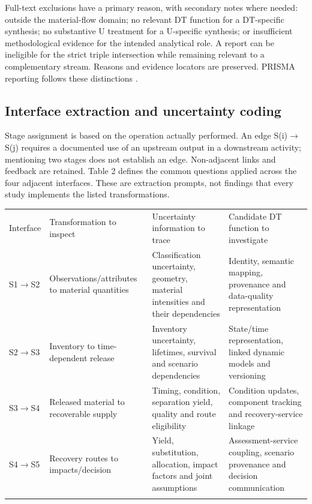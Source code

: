 Full-text exclusions have a primary reason, with secondary notes where needed: outside the material-flow domain; no relevant DT function for a DT-specific synthesis; no substantive U treatment for a U-specific synthesis; or insufficient methodological evidence for the intended analytical role. A report can be ineligible for the strict triple intersection while remaining relevant to a complementary stream. Reasons and evidence locators are preserved. PRISMA reporting follows these distinctions \citep{M01}.

\subsection{Interface extraction and uncertainty coding}

Stage assignment is based on the operation actually performed. An edge S(i)$\rightarrow$S(j) requires a documented use of an upstream output in a downstream activity; mentioning two stages does not establish an edge. Non-adjacent links and feedback are retained. Table 2 defines the common questions applied across the four adjacent interfaces. These are extraction prompts, not findings that every study implements the listed transformations.

\begin{center}\small\begin{tabularx}{\linewidth}{XXXX}\toprule
Interface & Transformation to inspect & Uncertainty information to trace & Candidate DT function to investigate\\\addlinespace
S1$\rightarrow$S2 & Observations/attributes to material quantities & Classification uncertainty, geometry, material intensities and their dependencies & Identity, semantic mapping, provenance and data-quality representation\\\addlinespace
S2$\rightarrow$S3 & Inventory to time-dependent release & Inventory uncertainty, lifetimes, survival and scenario dependencies & State/time representation, linked dynamic models and versioning\\\addlinespace
S3$\rightarrow$S4 & Released material to recoverable supply & Timing, condition, separation yield, quality and route eligibility & Condition updates, component tracking and recovery-service linkage\\\addlinespace
S4$\rightarrow$S5 & Recovery routes to impacts/decision & Yield, substitution, allocation, impact factors and joint assumptions & Assessment-service coupling, scenario provenance and decision communication\\\addlinespace
\bottomrule\end{tabularx}\end{center}

